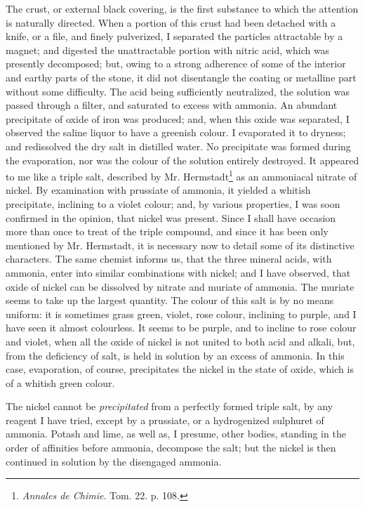 \documentclass[a4paper, 12pt, oneside, twocolumn]{article}
\begin{document}
The crust, or external black covering, is the first substance to which the attention is naturally directed. When a portion of this crust had been detached with a knife, or a file, and finely pulverized, I separated the particles attractable by a magnet; and digested the unattractable portion with nitric acid, which was presently decomposed; but, owing to a strong adherence of some of the interior and earthy parts of the stone, it did not disentangle the coating or metalline part without some difficulty. The acid being sufficiently neutralized, the solution was passed through a filter, and saturated to excess with ammonia. An abundant precipitate of oxide of iron was produced; and, when this oxide was separated, I observed the saline liquor to have a greenish colour. I evaporated it to dryness; and redissolved the dry salt in distilled water. No precipitate was formed during the evaporation, nor was the colour of the solution entirely destroyed. It appeared to me like a triple salt, described by Mr. Hermstadt\footnote{\emph{Annales de Chimie}. Tom. 22. p. 108.} as an ammoniacal nitrate of nickel. By examination with prussiate of ammonia, it yielded a whitish precipitate, inclining to a violet colour; and, by various properties, I was soon confirmed in the opinion, that nickel was present. Since I shall have occasion more than once to treat of the triple compound, and since it has been only mentioned by Mr. Hermstadt, it is necessary now to detail some of its distinctive characters. The same chemist informs us, that the three mineral acids, with ammonia, enter into similar combinations with nickel; and I have observed, that oxide of nickel can be dissolved by nitrate and muriate of ammonia. The muriate seems to take up the largest quantity. The colour of this salt is by no means uniform: it is sometimes grass green, violet, rose colour, inclining to purple, and I have seen it almost colourless. It seems to be purple, and to incline to rose colour and violet, when all the oxide of nickel is not united to both acid and alkali, but, from the deficiency of salt, is held in solution by an excess of ammonia. In this case, evaporation, of course, precipitates the nickel in the state of oxide, which is of a whitish green colour.

The nickel cannot be \emph{precipitated} from a perfectly formed triple salt, by any reagent I have tried, except by a prussiate, or a hydrogenized sulphuret of ammonia. Potash and lime, as well as, I presume, other bodies, standing in the order of affinities before ammonia, decompose the salt; but the nickel is then continued in solution by the disengaged ammonia.
\end{document}
